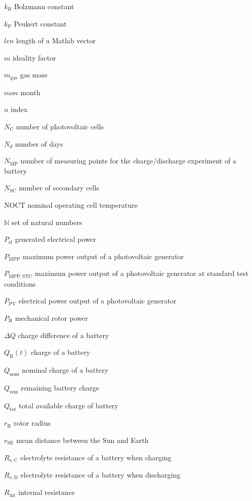 \begin{symb}
\item[$k_\mathrm{B}$]					Bolzmann constant
\item[$k_\mathrm{P}$]					Peukert constant
\item[$len$]							length of a Matlab vector
\item[$m$]								ideality factor
\item[$m_\mathrm{gas}$]					gas mass
\item[$mon$]							month
\item[$n$]								index
\item[$N_\mathrm{C}$]					number of photovoltaic cells
\item[$N_d$]							number of days
\item[$N_\mathrm{MP}$]					number of measuring points for the charge/discharge experiment of a battery
\item[$N_\mathrm{SC}$]					number of secondary cells
\item[$\mathrm{NOCT}$]					nominal operating cell temperature
\item[$\mathbb{N}$]						set of natural numbers
\item[$P_\mathrm{el}$]					generated electrical power
\item[$P_\mathrm{MPP}$]					maximum power output of a photovoltaic generator
\item[$P_\mathrm{MPP,STC}$]				maximum power output of a photovoltaic generator at standard test conditions
\item[$P_\mathrm{PV}$]					electrical power output of a photovoltaic generator
\item[$P_\mathrm{R}$]					mechanical rotor power
\item[$\Delta Q$]						charge difference of a battery
\item[$Q_\mathrm{B}(t)$]				charge of a battery
\item[$Q_\mathrm{nom}$]					nominal charge of a battery
\item[$Q_\mathrm{rem}$]					remaining battery charge
\item[$Q_\mathrm{tot}$]					total available charge of battery
\item[$r_\mathrm{R}$]					rotor radius
\item[$r_\mathrm{SE}$]					mean distance between the Sun and Earth
\item[$R_\mathrm{e,C}$]					electrolyte resistance of a battery when charging
\item[$R_\mathrm{e,D}$]					electrolyte resistance of a battery when discharging
\item[$R_\mathrm{int}$]					internal resistance

\end{symb}
